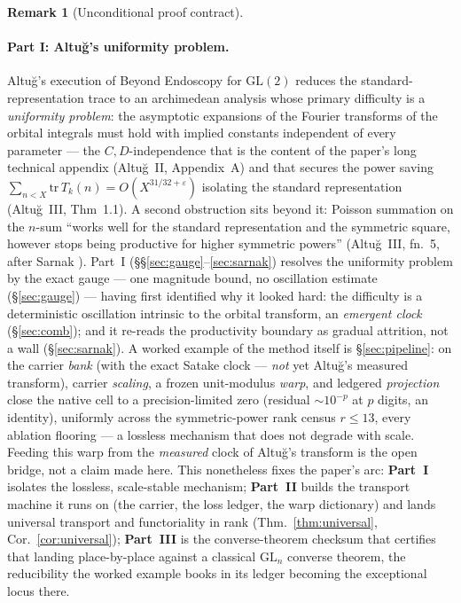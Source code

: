 \documentclass[11pt]{article}
\theoremstyle{definition}
\newtheorem{remark}[theorem]{Remark}
\begin{document}
\begin{remark}[Unconditional proof contract]
\begin{enumerate}
\paragraph{Part I: Altu\u{g}'s uniformity problem.} Altu\u{g}'s execution of Beyond Endoscopy for
$\mathrm{GL}(2)$ \cite{AltI,AltII,AltIII} reduces the standard-representation trace to an archimedean
analysis whose primary difficulty is a \emph{uniformity problem}: the asymptotic expansions of the
Fourier transforms of the orbital integrals must hold with implied constants independent of every
parameter --- the $C,D$-independence that is the content of the paper's long technical appendix
(Altu\u{g}~II, Appendix~A) and that secures the power saving
$\sum_{n<X}\mathrm{tr}\,T_k(n)=O(X^{31/32+\varepsilon})$ isolating the standard representation
(Altu\u{g}~III, Thm~1.1). A second obstruction sits beyond it: Poisson summation on the $n$-sum
``works well for the standard representation and the symmetric square, however stops being productive
for higher symmetric powers'' (Altu\u{g}~III, fn.~5, after Sarnak \cite{Sar}). Part~I
(\S\S\ref{sec:gauge}--\ref{sec:sarnak}) resolves the uniformity problem by the exact gauge --- one
magnitude bound, no oscillation estimate (\S\ref{sec:gauge}) --- having first identified why it looked
hard: the difficulty is a deterministic oscillation intrinsic to the orbital transform, an \emph{emergent clock}
(\S\ref{sec:comb}); and it re-reads the productivity boundary as gradual attrition, not a wall
(\S\ref{sec:sarnak}). A worked example of the method itself is \S\ref{sec:pipeline}: on the carrier
\emph{bank} (with the exact Satake clock --- \emph{not} yet Altu\u{g}'s measured transform), carrier
\emph{scaling}, a frozen unit-modulus \emph{warp}, and ledgered \emph{projection} close the native cell to a
precision-limited zero (residual $\sim10^{-p}$ at $p$ digits, an identity), uniformly across the
symmetric-power rank census $r\le13$, every ablation flooring --- a lossless mechanism that does not degrade
with scale. Feeding this warp from the \emph{measured} clock of Altu\u{g}'s transform is the open bridge, not a
claim made here. This nonetheless fixes the paper's arc: \textbf{Part~I} isolates the lossless, scale-stable
mechanism; \textbf{Part~II} builds the transport machine it runs on (the carrier, the loss ledger, the warp
dictionary) and lands universal transport and functoriality in rank (Thm.~\ref{thm:universal},
Cor.~\ref{cor:universal}); \textbf{Part~III} is the converse-theorem checksum that certifies that landing
place-by-place against a classical $\mathrm{GL}_n$ converse theorem, the reducibility the worked example books in
its ledger becoming the exceptional locus there.


\end{enumerate}
\end{remark}
\end{document}
